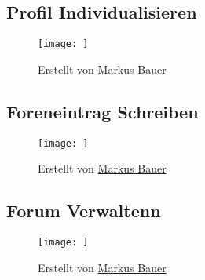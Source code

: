 \subsection*{Profil Individualisieren}
\begin{figure}[h!]
	\centering
	\texttt{[image: ]}
	\label{fig:ActDia_}
	\caption*{Erstellt von \hyperref[person:MarkusBauer]{Markus Bauer}}
\end{figure}

\subsection*{Foreneintrag Schreiben}
\begin{figure}[h!]
	\centering
	\texttt{[image: ]}
	\label{fig:ActDia_Foreneinntrag_Schreiben}
	\caption*{Erstellt von \hyperref[person:MarkusBauer]{Markus Bauer}}
\end{figure}

\subsection*{Forum Verwaltenn}
\begin{figure}[h!]
\centering
\texttt{[image: ]}
\label{fig:ActDia_Forum-Verwalten}
\caption*{Erstellt von \hyperref[person:MarkusBauer]{Markus Bauer}}
\end{figure}